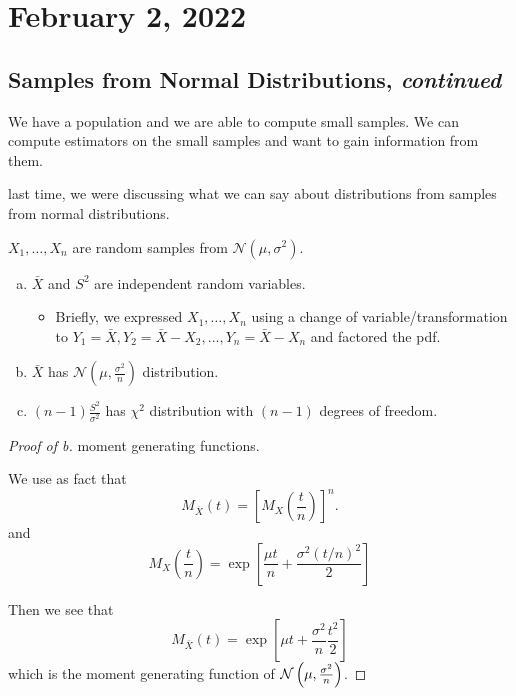\section{February 2, 2022}
\subsection{Samples from Normal Distributions, \emph{continued}}
We have a population and we are able to compute small samples. We can compute estimators on the small samples and want to gain information from them.

\recall last time, we were discussing what we can say about distributions from samples from normal distributions.

\begin{theorem*}
    $X_1, \dots, X_n$ are random samples from $\mathcal{N}(\mu, \sigma^2)$.
    \begin{enumerate}[a)]
        \item $\bar X$ and $S^2$ are independent random variables.
              \begin{itemize}
                  \item Briefly, we expressed $X_1, \dots, X_n$ using a change of variable/transformation to $Y_1 = \bar{X}, Y_2 = \bar{X} - X_2, \dots, Y_n = \bar{X} - X_n$ and factored the pdf.
              \end{itemize}
        \item $\bar X$ has $\mathcal{N}\left( \mu, \frac{\sigma^2}{n} \right)$ distribution.
        \item $(n-1)\frac{S^2}{\sigma^2}$ has $\chi^2$ distribution with $(n-1)$ degrees of freedom.
    \end{enumerate}
\end{theorem*}

\begin{proof}[Proof of b]
    \recall moment generating functions.

    We use as fact that
    \[M_{\bar X}(t) = \left[ M_X\left( \frac{t}{n} \right) \right]^n.\]
    and
    \[M_X\left( \frac{t}{n} \right) = \exp\left[ \frac{\mu t}{n} + \frac{\sigma^2 (t/n)^2}{2} \right]\]

    Then we see that
    \[M_{\bar X}(t) = \exp\left[ \mu t + \frac{\sigma^2}{n}\frac{t^2}{2}\right]\]
    which is the moment generating function of $\mathcal N\left( \mu, \frac{\sigma^2}{n} \right)$.
\end{proof}

